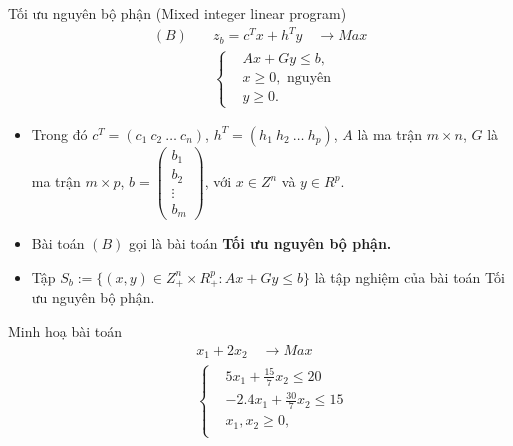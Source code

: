 \documentclass{beamer}
\begin{document}
\begin{frame}{Tối ưu nguyên bộ phận (Mixed integer linear program)}
\begin{equation}\label{B}
\begin{split}
(B) \quad & z_b=c^Tx+h^Ty \quad \longrightarrow Max \\
          & \left\{\begin{split}
            &Ax+Gy \leq  b, \\
            &x \geq 0, \text{ nguyên} \\
            &y \geq 0.
            \end{split}\right.    
\end{split}
\end{equation}    
\begin{itemize} \small
\item Trong đó $c^T=(c_1 \: c_2 \: \ldots \: c_n)$, $h^T=(h_1 \: h_2 \: \ldots \: h_p)$, $A$ là ma trận $m\times n$, $G$ là ma trận $m\times p$, $b=\begin{pmatrix}
    b_1 \\
    b_2 \\
    \vdots \\
    b_m
    \end{pmatrix}$, với $x\in Z^n$ và $y\in R^p$.
\item Bài toán $(B)$ gọi là bài toán \textbf{Tối ưu nguyên bộ phận.}
\item Tập $S_b:=\{(x,y)\in Z^n_+\times R^p_+: Ax+Gy\leq b\}$ là tập nghiệm của bài toán Tối ưu nguyên bộ phận.
\end{itemize}
\end{frame}
\begin{frame}{Minh hoạ bài toán}
   \begin{equation}
        \begin{split}
        \quad & x_1 + 2x_2 \quad \longrightarrow Max \\
                    & \left\{\begin{split}
                    & 5x_1 + \frac{15}{7}x_2 \leq 20 \\
                    & -2.4x_1 + \frac{30}{7}x_2 \leq 15 \\
                    &x_1, x_2 \geq 0, \\
                    \end{split}\right.    
        \end{split}
        \end{equation}            
\end{frame}
\end{document}
